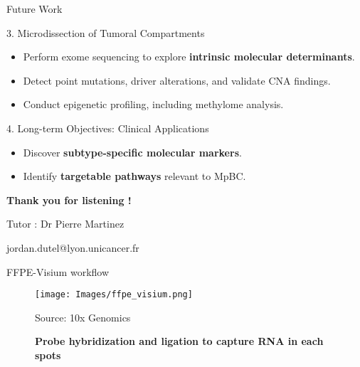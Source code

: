 \documentclass[aspectratio=169]{beamer}
\begin{document}
\begin{frame}{Future Work}
    
    \begin{block}{3. Microdissection of Tumoral Compartments}
    \begin{itemize}
        \item Perform exome sequencing to explore \textbf{intrinsic molecular determinants}.
        \item Detect point mutations, driver alterations, and validate CNA findings.
        \item Conduct epigenetic profiling, including methylome analysis.
    \end{itemize}
    \end{block}
    
    \begin{block}{4. Long-term Objectives: Clinical Applications}
    \begin{itemize}
        \item Discover \textbf{subtype-specific molecular markers}.
        \item Identify \textbf{targetable pathways} relevant to MpBC.
    \end{itemize}
    \end{block}

\end{frame}


\begin{frame}
    \begin{center}
    \textbf{Thank you for listening !}

    \vspace{1cm}

    Tutor : Dr Pierre Martinez \\

    \vspace{1cm}

    jordan.dutel@lyon.unicancer.fr
    \end{center}
\end{frame}







\begin{frame}{FFPE-Visium workflow} %
    \begin{figure}
        \begin{minipage}{0.75\textwidth}
            \texttt{[image: Images/ffpe\_visium.png]}
        \end{minipage}%
        \hfill
        \begin{minipage}{0.23\textwidth}
            \vspace{5.5cm}
            \raggedleft
            {\tiny \color{gray} Source: 10x Genomics}
        \end{minipage}
        \centering
        \textbf{Probe hybridization and ligation to capture RNA in each spots}
    \end{figure}
\end{frame}
\end{document}
